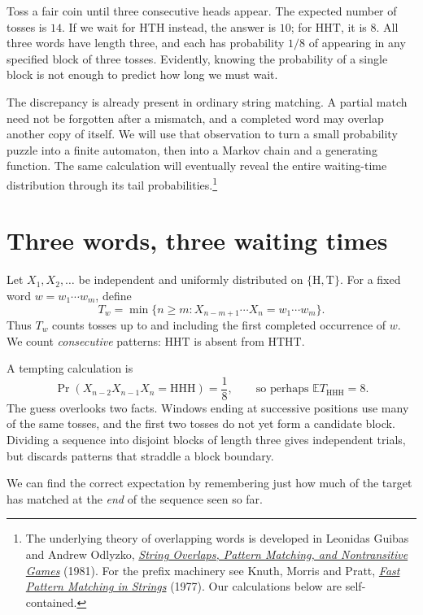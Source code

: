 
Toss a fair coin until three consecutive heads appear. The expected number of tosses is \(14\). If we wait for \(\mathrm{HTH}\) instead, the answer is \(10\); for \(\mathrm{HHT}\), it is \(8\). All three words have length three, and each has probability \(1/8\) of appearing in any specified block of three tosses. Evidently, knowing the probability of a single block is not enough to predict how long we must wait.

The discrepancy is already present in ordinary string matching. A partial match need not be forgotten after a mismatch, and a completed word may overlap another copy of itself. We will use that observation to turn a small probability puzzle into a finite automaton, then into a Markov chain and a generating function. The same calculation will eventually reveal the entire waiting-time distribution through its tail probabilities.\footnote{The underlying theory of overlapping words is developed in Leonidas Guibas and Andrew Odlyzko, \href{https://doi.org/10.1016/0097-3165(81)90005-4}{\emph{String Overlaps, Pattern Matching, and Nontransitive Games}} (1981). For the prefix machinery see Knuth, Morris and Pratt, \href{https://doi.org/10.1137/0206024}{\emph{Fast Pattern Matching in Strings}} (1977). Our calculations below are self-contained.}

\section{Three words, three waiting times}

Let \(X_1,X_2,\ldots\) be independent and uniformly distributed on \(\{\mathrm H,\mathrm T\}\). For a fixed word \(w=w_1\cdots w_m\), define
\[
 T_w=\min\bigl\{n\geq m:
       X_{n-m+1}\cdots X_n=w_1\cdots w_m\bigr\}.
\]
Thus \(T_w\) counts tosses up to and including the first completed occurrence of \(w\). We count \emph{consecutive} patterns: \(\mathrm{HHT}\) is absent from \(\mathrm{HTHT}\).

A tempting calculation is
\[
 \Pr(X_{n-2}X_{n-1}X_n=\mathrm{HHH})=\frac18,
 \qquad
 \text{so perhaps }\mathbb E T_{\mathrm{HHH}}=8.
\]
The guess overlooks two facts. Windows ending at successive positions use many of the same tosses, and the first two tosses do not yet form a candidate block. Dividing a sequence into disjoint blocks of length three gives independent trials, but discards patterns that straddle a block boundary.

We can find the correct expectation by remembering just how much of the target has matched at the \emph{end} of the sequence seen so far.

